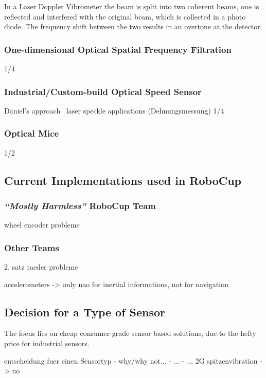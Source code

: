 \documentclass[12pt,a4paper]{article}
\newcommand{\MH}{\emph{``Mostly Harmless''} RoboCup Team\xspace}
\begin{document}

In a Laser Doppler Vibrometer the beam is split into two coherent beams, one is reflected and interfered with the original beam, which is collected in a photo diode. 
The frequency shift between the two results in an overtone at the detector.


\subsubsection{One-dimensional Optical Spatial Frequency Filtration}
1/4



\subsubsection{Industrial/Custom-build Optical Speed Sensor}
        Daniel's approach~\cite{Hrach2006}
        laser speckle applications (Dehnungsmessung) 
1/4
\subsubsection{Optical Mice}
1/2

\subsection{Current Implementations used in RoboCup}

\subsubsection{\MH}
      wheel encoder
        probleme
\subsubsection{Other Teams}
      2. satz raeder
        probleme

  accelerometers -> only nao for inertial informations, not for navigation

\subsection{Decision for a Type of Sensor}

The focus lies on cheap consumer-grade sensor based solutions, due to the hefty price for industrial sensors.

  entscheidung fuer einen Sensortyp
    - why/why not...
    - ...
    - ...
        2G spitzenvibration -> no
\end{document}
